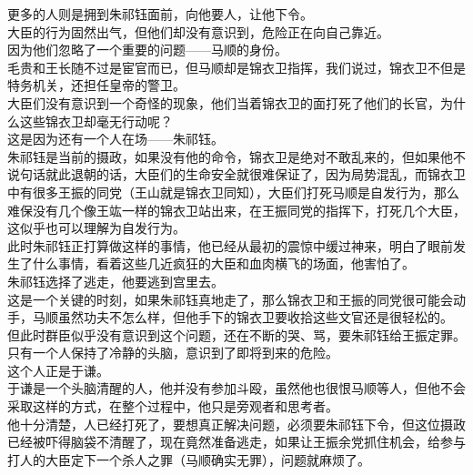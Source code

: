 \begin{multicols}{\theparacolNo}
更多的人则是拥到朱祁钰面前，向他要人，让他下令。\\

大臣的行为固然出气，但他们却没有意识到，危险正在向自己靠近。\\

因为他们忽略了一个重要的问题——马顺的身份。\\

毛贵和王长随不过是宦官而已，但马顺却是锦衣卫指挥，我们说过，锦衣卫不但是特务机关，还担任皇帝的警卫。\\

大臣们没有意识到一个奇怪的现象，他们当着锦衣卫的面打死了他们的长官，为什么这些锦衣卫却毫无行动呢？\\

这是因为还有一个人在场——朱祁钰。\\

朱祁钰是当前的摄政，如果没有他的命令，锦衣卫是绝对不敢乱来的，但如果他不说句话就此退朝的话，大臣们的生命安全就很难保证了，因为局势混乱，而锦衣卫中有很多王振的同党（王山就是锦衣卫同知），大臣们打死马顺是自发行为，那么难保没有几个像王竑一样的锦衣卫站出来，在王振同党的指挥下，打死几个大臣，这似乎也可以理解为自发行为。\\

此时朱祁钰正打算做这样的事情，他已经从最初的震惊中缓过神来，明白了眼前发生了什么事情，看着这些几近疯狂的大臣和血肉横飞的场面，他害怕了。\\

朱祁钰选择了逃走，他要逃到宫里去。\\

这是一个关键的时刻，如果朱祁钰真地走了，那么锦衣卫和王振的同党很可能会动手，马顺虽然功夫不怎么样，但他手下的锦衣卫要收拾这些文官还是很轻松的。\\

但此时群臣似乎没有意识到这个问题，还在不断的哭、骂，要朱祁钰给王振定罪。\\

只有一个人保持了冷静的头脑，意识到了即将到来的危险。\\

这个人正是于谦。\\

于谦是一个头脑清醒的人，他并没有参加斗殴，虽然他也很恨马顺等人，但他不会采取这样的方式，在整个过程中，他只是旁观者和思考者。\\

他十分清楚，人已经打死了，要想真正解决问题，必须要朱祁钰下令，但这位摄政已经被吓得脑袋不清醒了，现在竟然准备逃走，如果让王振余党抓住机会，给参与打人的大臣定下一个杀人之罪（马顺确实无罪），问题就麻烦了。\\


\end{multicols}
